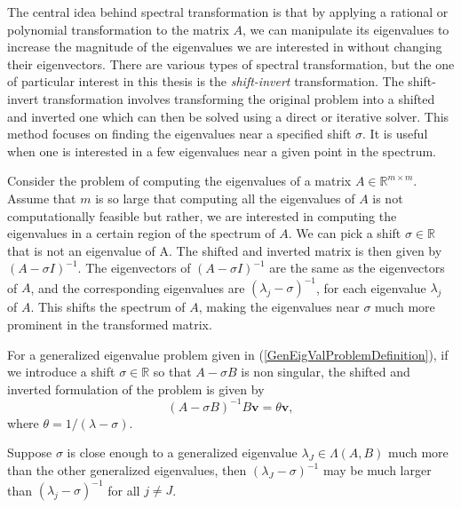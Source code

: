 The central idea behind spectral transformation is that by applying a rational or polynomial transformation to the matrix $A$, we can manipulate its eigenvalues to increase the magnitude of the eigenvalues we are interested in without changing their eigenvectors. There are various types of spectral transformation, but the one of particular interest in this thesis is the \textit{shift-invert} transformation. The shift-invert transformation involves transforming the original problem into a shifted and inverted one which can then be solved using a direct or iterative solver. This method focuses on finding the eigenvalues near a specified shift $\sigma$. It is useful when one is interested in a few eigenvalues near a given point in the spectrum.

Consider the problem of computing the eigenvalues of a matrix $A \in \mathbb{R}^{m \times m}$. Assume that $m$ is so large that computing all the eigenvalues of $A$ is not computationally feasible but rather, we are interested in computing the eigenvalues in a certain region of the spectrum of $A$. We can pick a shift $\sigma \in \mathbb{R}$ that is not an eigenvalue of A. The shifted and inverted matrix is then given by $(A - \sigma I)^{-1}$. The eigenvectors of $(A - \sigma I)^{-1}$ are the same as the eigenvectors of $A$, and the corresponding eigenvalues are $(\lambda_j - \sigma)^{-1}$, for each eigenvalue $\lambda_j$ of $A$. This shifts the spectrum of $A$, making the eigenvalues near $\sigma$ much more prominent in the transformed matrix.

For a generalized eigenvalue problem given in (\ref{GenEigValProblemDefinition}), if we introduce a shift $\sigma \in \mathbb{R}$ so that $A - \sigma B$ is non singular, the shifted and inverted formulation of the problem is given by
\begin{equation}\label{eq:SpectralTransFormulation}
       (A - \sigma B)^{-1} B\mathbf{v} = \theta \mathbf{v},
\end{equation}
where $\theta = 1 / (\lambda - \sigma)$.

Suppose $\sigma$ is close enough to a generalized eigenvalue $\lambda_J \in \Lambda(A, B)$ much more than the other generalized eigenvalues, then $(\lambda_J - \sigma)^{-1}$ may be much larger than $(\lambda_j - \sigma)^{-1}$ for all $j \neq J$. 

